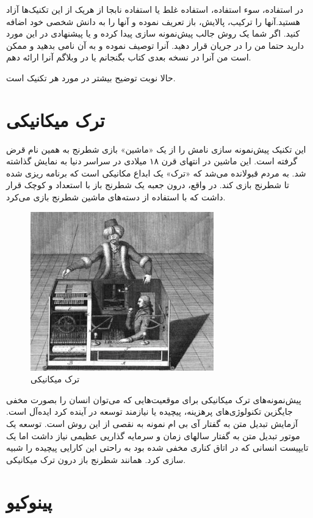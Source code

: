 در استفاده، سوء استفاده، استفاده غلط یا استفاده نابجا از هریک از این
تکنیک‌ها آزاد هستید.آنها را ترکیب، پالایش، باز تعریف نموده و آنها را به
دانش شخصی خود اضافه کنید. اگر شما یک روش جالب پیش‌نمونه سازی پیدا کرده و
یا پیشنهادی در این مورد دارید حتما من را در جریان قرار دهید. آنرا توصیف
نموده و به آن نامی بدهید و ممکن است من آنرا در نسخه بعدی کتاب بگنجانم یا
در وبلاگم آنرا ارائه دهم.

حالا نوبت توضیح بیشتر در مورد هر تکنیک است.

\section{ترک
میکانیکی}\label{ux62aux631ux6a9-ux645ux6ccux6a9ux627ux646ux6ccux6a9ux6cc}

این تکنیک پیش‌نمونه سازی نامش را از یک «ماشین» بازی شطرنج به همین نام
قرض گرفته است. این ماشین در انتهای قرن ۱۸ میلادی در سراسر دنیا به نمایش
گذاشته شد. به مردم قبولانده می‌شد که «ترک» یک ابداع مکانیکی است که
برنامه ریزی شده تا شطرنج بازی کند. در واقع، درون جعبه یک شطرنج باز با
استعداد و کوچک قرار داشت که با استفاده از دسته‌های ماشین شطرنج بازی
می‌کرد.

\begin{figure}[htbp]
\centering
\includegraphics{mechanicaltork.png}
\caption{ترک میکانیکی}
\end{figure}

پیش‌نمونه‌های ترک میکانیکی برای موقعیت‌هایی که می‌توان انسان را بصورت
مخفی جایگزین تکنولوژی‌های پرهزینه، پیچیده یا نیازمند توسعه در آینده کرد
ایده‌آل است. آزمایش تبدیل متن به گفتار آی بی ام نمونه به نقصی از این روش
است. توسعه یک موتور تبدیل متن به گفتار سالهای زمان و سرمایه گذاریی عظیمی
نیاز داشت اما یک تایپیست انسانی که در اتاق کناری مخفی شده بود به راحتی
این کارایی پیچیده را شبیه سازی کرد. همانند شطرنج باز درون ترک میکانیکی.

\section{پینوکیو}\label{ux67eux6ccux646ux648ux6a9ux6ccux648}

